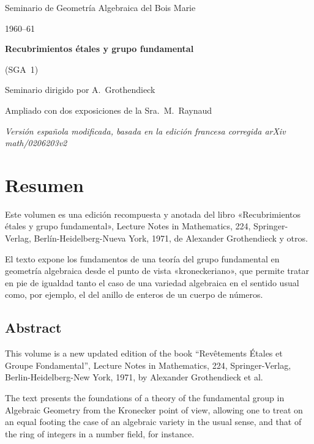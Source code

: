 \frontmatter
\begin{titlepage}
  \centering
  \vspace*{18mm}
  {\Large Seminario de Geometría Algebraica del Bois Marie\par}
  \vspace{3mm}
  {\Large 1960--61\par}
  \vspace{16mm}
  {\Huge\bfseries Recubrimientos étales y grupo fundamental\par}
  \vspace{4mm}
  {\LARGE (SGA~1)\par}
  \vspace{20mm}
  {\large Seminario dirigido por A.\ Grothendieck\par}
  \vspace{2mm}
  {\normalsize Ampliado con dos exposiciones de la Sra.\ M.\ Raynaud\par}
  \vfill
  {\small\itshape Versión española modificada, basada en la edición francesa corregida arXiv math/0206203v2\par}
\end{titlepage}

\chapter*{Resumen}
Este volumen es una edición recompuesta y anotada del libro «Recubrimientos étales y grupo fundamental», Lecture Notes in Mathematics, 224, Springer-Verlag, Berlín-Heidelberg-Nueva York, 1971, de Alexander Grothendieck y otros.

El texto expone los fundamentos de una teoría del grupo fundamental en geometría algebraica desde el punto de vista «kroneckeriano», que permite tratar en pie de igualdad tanto el caso de una variedad algebraica en el sentido usual como, por ejemplo, el del anillo de enteros de un cuerpo de números.

\begin{otherlanguage}{english}
\chapter*{Abstract}
This volume is a new updated edition of the book ``Rev\^etements \'Etales et Groupe Fondamental'', Lecture Notes in Mathematics, 224, Springer-Verlag, Berlin-Heidelberg-New York, 1971, by Alexander Grothendieck et al.

The text presents the foundations of a theory of the fundamental group in Algebraic Geometry from the Kronecker point of view, allowing one to treat on an equal footing the case of an algebraic variety in the usual sense, and that of the ring of integers in a number field, for instance.
\end{otherlanguage}

